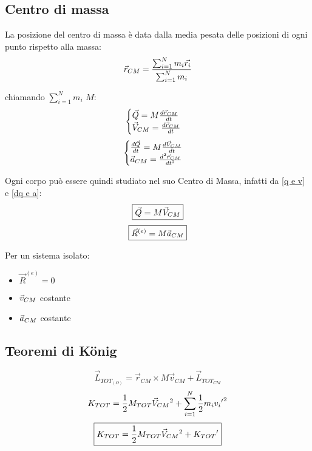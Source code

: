 \subsection{Centro di massa}
La posizione del centro di massa è data dalla media pesata delle posizioni di ogni punto rispetto alla massa:
\begin{equation}
    \vec{r}_{\tiny{CM}} = \frac{\sum_{i=1}^N m_i \vec{r_i}}{\sum_{i=1}^N m_i}
\end{equation}

chiamando $\sum_{i=1}^N m_i$ $M$:
\begin{equation}
    \begin{cases}
        \vec{Q}=M\frac{d\vec{r}_{CM}}{dt} \\
        \vec{V}_{\tiny{CM}}=\frac{d\vec{r}_{CM}}{dt}
    \end{cases}
    \label{q e v}
\end{equation}
\begin{equation}
    \begin{cases}
        \frac{d\vec{Q}}{dt}=M\frac{d\vec{V}_{CM}}{dt} \\
        \vec{a}_{\tiny{CM}}=\frac{d^2\vec{r}_{CM}}{dt^2}
    \end{cases} 
    \label{dq e a}
\end{equation}

Ogni corpo può essere quindi studiato nel suo Centro di Massa, infatti da \eqref{q e v} e \eqref{dq e a}:
\begin{equation}
    \boxed{\vec{Q} = M\vec{V}_{\tiny{CM}}}
\end{equation}
\begin{equation}
    \boxed{\vec{R}^{(e)} = M\vec{a}_{\tiny{CM}}}
\end{equation}

Per un sistema isolato:
\begin{itemize}
    \item $\vec{R}^{(e)} = 0$
    \item $\vec{v}_{\tiny{CM}}$ costante
    \item $\vec{a}_{\tiny{CM}}$ costante
\end{itemize}

\subsection{Teoremi di König}
\begin{equation}
    \boxed{\vec{L}_{TOT_{(O)}} = \vec{r}_{CM} \times M \vec{v}_{CM} + \vec{L}_{TOT_{CM}}}
    \label{konig1}
\end{equation}
\vspace{\baselineskip}
\begin{equation*}
    K_{TOT} = \frac{1}{2}M_{TOT} \vec{V}_{\tiny{CM}}{^2} + \sum_{i=1}^N \frac{1}{2} m_i v_i{'}^2 
\end{equation*}
\begin{equation}
    \boxed{K_{TOT} = \frac{1}{2}M_{TOT} \vec{V}_{\tiny{CM}}{^2} + K_{TOT}{'}}
\end{equation}



